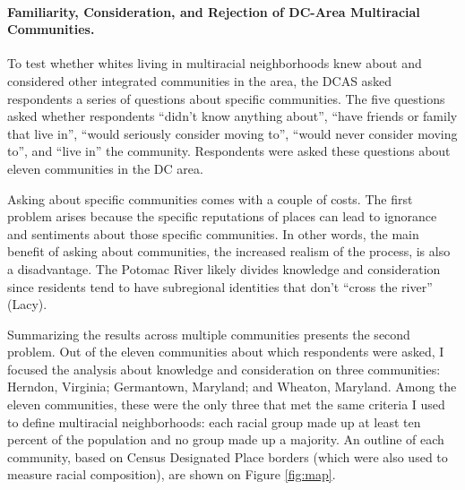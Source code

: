 \documentclass{baderart}
\begin{document}
\paragraph{Familiarity, Consideration, and Rejection of DC-Area Multiracial Communities.}

To test whether whites living in multiracial neighborhoods knew about and considered other integrated communities in the area, the DCAS asked respondents a series of questions about specific communities. The five questions asked whether respondents ``didn't know anything about'', ``have friends or family that live in'', ``would seriously consider moving to'', ``would never consider moving to'', and ``live in'' the community. Respondents were asked these questions about eleven communities in the DC area.

Asking about specific communities comes with a couple of costs. The first problem arises because the specific reputations of places can lead to ignorance and sentiments about those specific communities. In other words, the main benefit of asking about communities, the increased realism of the process, is also a disadvantage. The Potomac River likely divides knowledge and consideration since residents tend to have subregional identities that don't ``cross the river'' (Lacy).

Summarizing the results across multiple communities presents the second problem. Out of the eleven communities about which respondents were asked, I focused the analysis about knowledge and consideration on three communities: Herndon, Virginia; Germantown, Maryland; and Wheaton, Maryland. Among the eleven communities, these were the only three that met the same criteria I used to define multiracial neighborhoods: each racial group made up at least ten percent of the population and no group made up a majority. An outline of each community, based on Census Designated Place borders (which were also used to measure racial composition), are shown on Figure \ref{fig:map}.
\end{document}
